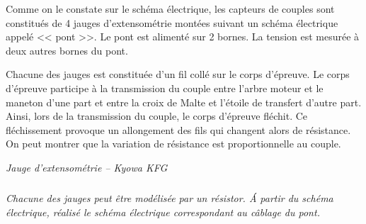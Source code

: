 \documentclass[10pt]{article}
\begin{document}
\begin{minipage}[c]{.78\linewidth}

Comme on le constate sur le schéma électrique, les capteurs de couples sont constitués de 4 jauges d'extensométrie montées suivant un schéma électrique appelé << pont >>. Le pont est alimenté sur 2 bornes. La tension est mesurée à deux autres bornes du pont. 


Chacune des jauges est constituée d'un fil collé sur le corps d'épreuve. Le corps d'épreuve participe à la transmission du couple entre l'arbre moteur et le maneton d'une part et entre la croix de Malte et l'étoile de transfert d'autre part. Ainsi, lors de la transmission du couple, le corps d'épreuve fléchit. Ce fléchissement provoque un allongement des fils qui changent alors de résistance. On peut montrer que la variation de résistance est proportionnelle au couple. 

\end{minipage} \hfill
\begin{minipage}[c]{.2\linewidth}
\begin{center}

\textit{Jauge d'extensométrie -- Kyowa KFG}
\end{center}
\end{minipage}

\subparagraph{}
\textit{Chacune des jauges peut être modélisée par un résistor. \'A partir du schéma 
électrique, réalisé le schéma électrique correspondant au câblage du pont.} 
\end{document}
